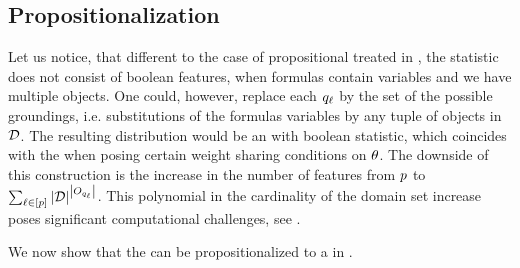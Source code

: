 \subsection{Propositionalization}

Let us notice, that different to the case of propositional \HybridLogicNetworks{} treated in , the statistic does not consist of boolean features, when formulas contain variables and we have multiple objects.
One could, however, replace each $q_{\ell}$ by the set of the possible groundings, i.e. substitutions of the formulas variables by any tuple of objects in $\mathcal{D}$.
The resulting distribution would be an \HybridLogicNetwork{} with boolean statistic, which coincides with the \HybridFOLNetwork{} when posing certain weight sharing conditions on $\theta$.
The downside of this construction is the increase in the number of features from $p$ to $\sum_{\ell\in[p]} \left|\mathcal{D}\right|^{\left|O_{q_{\ell}}\right|}$.
This polynomial in the cardinality of the domain set increase poses significant computational challenges, see \cite{richardson_markov_2006}.

We now show that the \HybridFOLNetwork{} can be propositionalized to a \HybridLogicNetwork{} in \propositionalLogic{}.

